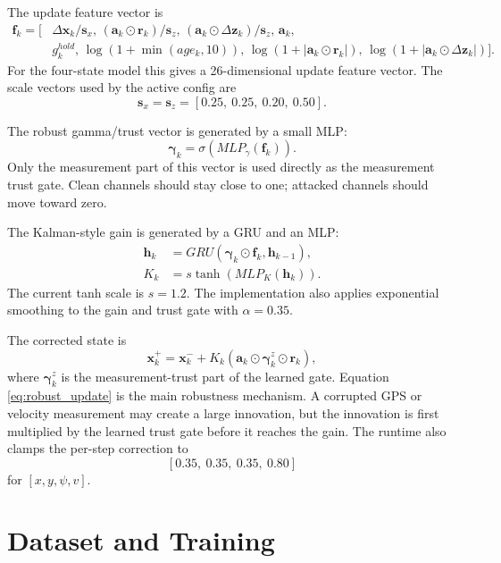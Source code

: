 \documentclass[11pt,a4paper]{article}
\newcommand{\state}{\bm{x}}
\newcommand{\meas}{\bm{z}}
\newcommand{\trust}{\bm{\gamma}}
\newcommand{\avail}{\bm{a}}
\newcommand{\innov}{\bm{r}}
\begin{document}
The update feature vector is
\begin{equation}
\begin{aligned}
  \bm{f}_k =
  [&\Delta\state_k / \bm{s}_x,\,
    (\avail_k \odot \innov_k) / \bm{s}_z,\,
    (\avail_k \odot \Delta\meas_k) / \bm{s}_z,\,
    \avail_k,\\
   &g^{hold}_k,\,
    \log(1+\min(age_k,10)),\,
    \log(1+|\avail_k\odot\innov_k|),\,
    \log(1+|\avail_k\odot\Delta\meas_k|)] .
\end{aligned}
\end{equation}
For the four-state model this gives a 26-dimensional update feature vector.
The scale vectors used by the active config are
\[
  \bm{s}_x=\bm{s}_z=[0.25,\ 0.25,\ 0.20,\ 0.50].
\]

The robust gamma/trust vector is generated by a small MLP:
\begin{equation}
  \trust_k = \sigma(MLP_{\gamma}(\bm{f}_k)).
\end{equation}
Only the measurement part of this vector is used directly as the measurement
trust gate. Clean channels should stay close to one; attacked channels should
move toward zero.

The Kalman-style gain is generated by a GRU and an MLP:
\begin{align}
  \bm{h}_k &= GRU(\trust_k \odot \bm{f}_k,\bm{h}_{k-1}), \\
  K_k &= s\tanh(MLP_K(\bm{h}_k)).
\end{align}
The current tanh scale is $s=1.2$. The implementation also applies exponential
smoothing to the gain and trust gate with $\alpha=0.35$.

The corrected state is
\begin{equation}
  \state_k^+
  =
  \state_k^-
  +
  K_k
  \left(
    \avail_k \odot \trust_k^z \odot \innov_k
  \right),
  \label{eq:robust_update}
\end{equation}
where $\trust_k^z$ is the measurement-trust part of the learned gate. Equation
\eqref{eq:robust_update} is the main robustness mechanism. A corrupted GPS or
velocity measurement may create a large innovation, but the innovation is first
multiplied by the learned trust gate before it reaches the gain. The runtime
also clamps the per-step correction to
\[
  [0.35,\ 0.35,\ 0.35,\ 0.80]
\]
for $[x,y,\psi,v]$.

\section{Dataset and Training}
\end{document}
